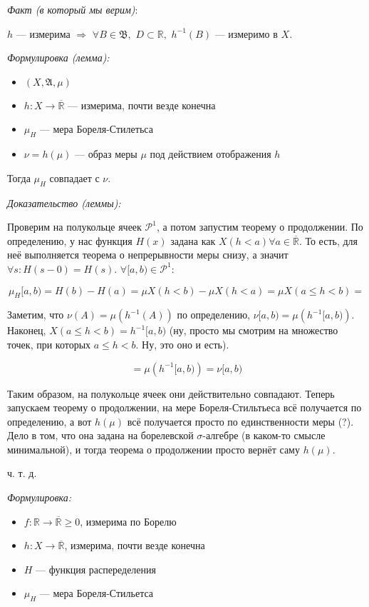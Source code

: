 \documentclass{article}
\def\dbl{\,\,}
\def\rinf{\overline{\mathbb{R}}}
\begin{document}
\textit{Факт (в который мы верим)}:

$h$ --- измерима $\Rightarrow \dbl \forall B \in \mathfrak{B}, \dbl D \subset \mathbb{R}, \dbl h^{-1}(B)$ --- измеримо в $X$.

\textit{Формулировка (лемма):}

\begin{itemize}
    \item $(X, \mathfrak{A}, \mu)$
    \item $h: X \rightarrow \rinf$ --- измерима, почти везде конечна
    \item $\mu_H$ --- мера Бореля-Стилетьса
    \item $\nu = h(\mu)$ --- образ меры $\mu$ под действием отображения $h$
\end{itemize}

Тогда $\mu_H$ совпадает с $\nu$.

\textit{Доказательство (леммы):}

Проверим на полукольце ячеек $\mathcal{P}^1$, а потом запустим теорему о продолжении. По определению, у нас функция $H(x)$ задана как $X(h < a) \forall a \in \rinf$. То есть, для неё выполняется теорема о непрерывности меры снизу, а значит $\forall s: H(s - 0) = H(s)$. $\forall [a, b) \in \mathcal{P}^1$:

\[\mu_H[a, b) = H(b) - H(a) = \mu X(h < b) - \mu X(h < a) = \mu X(a \le h < b) = \]

Заметим, что $\nu(A) = \mu(h^{-1}(A))$ по определению, $\nu [a, b) = \mu\left(h^{-1} [a, b)\right)$. Наконец, $X(a \le h < b) = h^{-1}[a, b)$ (ну, просто мы смотрим на множество точек, при которых $a \le h < b$. Ну, это оно и есть).

\[ = \mu\left(h^{-1} [a, b)\right) = \nu [a, b)\]

Таким образом, на полукольце ячеек они действительно совпадают. Теперь запускаем теорему о продолжении, на мере Бореля-Стильтьеса всё получается по определению, а вот $h(\mu)$ всё получается просто по единственности меры (?). Дело в том, что она задана на борелевской $\sigma$-алгебре (в каком-то смысле минимальной), и тогда теорема о продолжении просто вернёт саму $h(\mu)$.

ч. т. д. 

\textit{Формулировка:}

\begin{itemize}
    \item $f: \mathbb{R} \rightarrow \rinf \ge 0$, измерима по Борелю
    \item $h: X \rightarrow \rinf$, измерима, почти везде конечна
    \item $H$ --- функция распеределения
    \item $\mu_{H}$ --- мера Бореля-Стильетса
\end{itemize}
\end{document}
